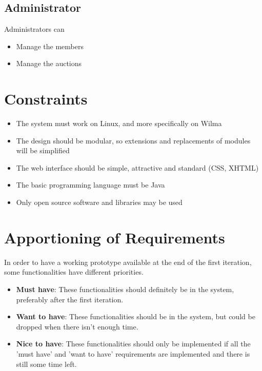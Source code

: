 	\subsection{Administrator}
		Administrators can
		\begin{itemize}
			\item Manage the members
			\item Manage the auctions
		\end{itemize}
\section{Constraints}
\begin{itemize}
	\item The system must work on Linux, and more specifically on Wilma
	\item The design should be modular, so extensions and replacements of 
	modules will be simplified
	\item The web interface should be simple, attractive and standard
	(CSS, XHTML)
	\item The basic programming language must be Java
	\item Only open source software and libraries may be used
\end{itemize}
\section{Apportioning of Requirements}
	In order to have a working prototype available at the end of the
	first iteration, some functionalities have different priorities.
	\begin{itemize}
		\item \textbf{Must have}: These functionalities should definitely 
		be in the system, preferably after the first iteration.
		\item \textbf{Want to have}: These functionalities should be in 
		the system, but could be dropped when there isn't enough time.
		\item \textbf{Nice to have}: These functionalities should only be 
		implemented if all the 'must have' and 'want to have' 
		requirements are implemented and there is still some time left.
	\end{itemize}